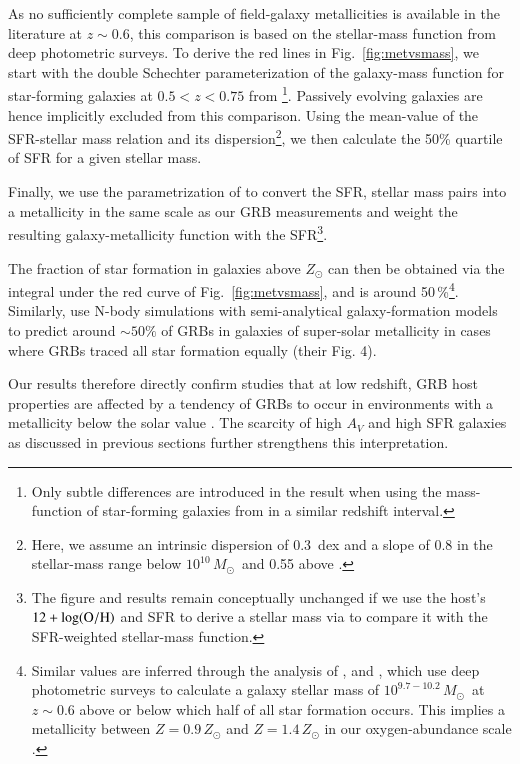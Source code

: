 \documentclass[traditabstract, longauth]{aa}
\newcommand{\oh}{12+\log(\rm{O/H})}
\newcommand{\Msun}{$M_\odot$}
\begin{document}
As no sufficiently complete sample of field-galaxy metallicities is available in the literature at $z\sim0.6$, this comparison is based on the stellar-mass function from deep photometric surveys. To derive the red lines in Fig.~\ref{fig:metvsmass}, we start with the double Schechter parameterization of the galaxy-mass function {for star-forming galaxies at $0.5<z<0.75$} from \citet{2014ApJ...783...85T}\footnote{{Only subtle differences are introduced in the result when using the mass-function of star-forming galaxies from \citet{2013A&A...556A..55I} in a similar redshift interval.}}. {Passively evolving galaxies are hence implicitly excluded from this comparison.} Using the mean-value of the SFR-stellar mass relation and its dispersion\footnote{{Here, we assume an intrinsic dispersion of 0.3~dex \citep{2014ApJS..214...15S} and a slope of 0.8 in the stellar-mass range below $10^{10}$\,\Msun\, \citep{2009MNRAS.394....3D, 2009A&A...504..751S, 2014MNRAS.437.3516S} and 0.55 above \citep{2012ApJ...754L..29W}.}}, we then calculate the 50\% quartile of SFR for a given stellar mass.
 
 {Finally, we use the parametrization of \citet{2010MNRAS.408.2115M} to convert the SFR, stellar mass pairs into a metallicity in the same scale as our GRB measurements and weight the resulting galaxy-metallicity function with the SFR\footnote{The figure and results remain conceptually unchanged if we use the host's $\oh$ and SFR to derive a stellar mass via \citet{2010MNRAS.408.2115M} to compare it with the SFR-weighted stellar-mass function.}.}

 {The fraction of star formation in galaxies above $Z_{\odot}$ can then be obtained via the integral under the red curve of Fig.~\ref{fig:metvsmass}, and is around 50\,\%\footnote{Similar values are inferred through the analysis of \citet{2013ApJ...778..128P}, \citet{2014A&A...565A.112H} and \citet{2014MNRAS.437.3516S}, which use deep photometric surveys \citep{2009ApJ...702.1393K, 2013A&A...556A..55I} to calculate a galaxy stellar mass of $10^{9.7-10.2}$\,\Msun\, at $z\sim0.6$ above or below which half of all star formation occurs. This implies a metallicity between $Z=0.9\,Z_{\odot}$ and $Z=1.4\,Z_{\odot}$ in our oxygen-abundance scale \citep{2010MNRAS.408.2115M}.}. Similarly, \citet{2011MNRAS.417.1013C} use N-body simulations with semi-analytical galaxy-formation models to predict around $\sim 50\%$ of GRBs in galaxies of super-solar metallicity in cases where GRBs traced all star formation equally (their Fig. 4).}

Our results therefore directly confirm studies that at low redshift, GRB host properties are affected by a tendency of GRBs {to occur in environments with a metallicity below the solar value} \citep[e.g.,][]{2006ApJ...642..636L, 2009ApJ...702..377K, 2010AJ....140.1557L, 2013ApJ...774..119G, 2013ApJ...778..128P, 2013A&A...557A..34B, 2014arXiv1409.7064V, 2015arXiv150304246S, 2015arXiv150402479P}. The scarcity of high $A_V$ and high SFR galaxies as discussed in previous sections further strengthens this interpretation.
\end{document}
